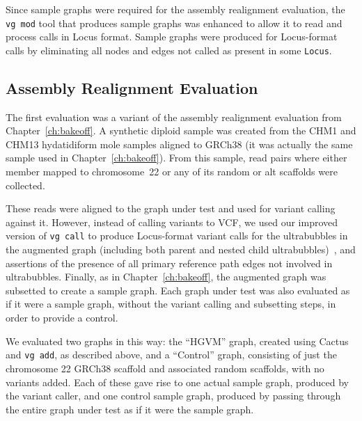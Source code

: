 Since sample graphs were required for the assembly realignment evaluation, the \texttt{vg mod} tool that produces sample graphs was enhanced to allow it to read and process calls in Locus format. Sample graphs were produced for Locus-format calls by eliminating all nodes and edges not called as present in some \texttt{Locus}.

\subsection{Assembly Realignment Evaluation}
\label{subsec:assemblyrealignmentevaluation}

The first evaluation was a variant of the assembly realignment evaluation from Chapter~\ref{ch:bakeoff}. A synthetic diploid sample was created from the CHM1 and CHM13 hydatidiform mole samples aligned to GRCh38 (it was actually the same sample used in Chapter~\ref{ch:bakeoff}). From this sample, read pairs where either member mapped to chromosome~22 or any of its random or alt scaffolds were collected. 

These reads were aligned to the graph under test and used for variant calling against it. However, instead of calling variants to VCF, we used our improved version of \texttt{vg call} to produce Locus-format variant calls for the ultrabubbles in the augmented graph (including both parent and nested child ultrabubbles)~\cite{paten2017superbubbles}, and assertions of the presence of all primary reference path edges not involved in ultrabubbles. Finally, as in Chapter~\ref{ch:bakeoff}, the augmented graph was subsetted to create a sample graph. Each graph under test was also evaluated as if it were a sample graph, without the variant calling and subsetting steps, in order to provide a control.

We evaluated two graphs in this way: the ``HGVM'' graph, created using Cactus and \texttt{vg add}, as described above, and a ``Control'' graph, consisting of just the chromosome 22 GRCh38 scaffold and associated random scaffolds, with no variants added. Each of these gave rise to one actual sample graph, produced by the variant caller, and one control sample graph, produced by passing through the entire graph under test as if it were the sample graph.

